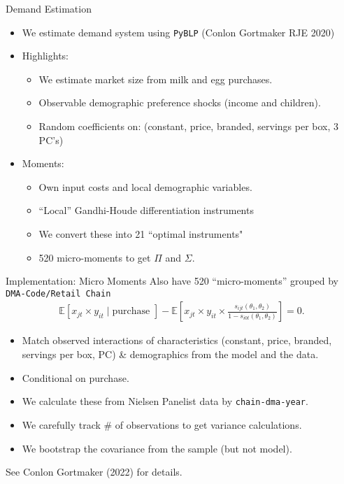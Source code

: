 \begin{frame}[plain,label=maindemand]{Demand Estimation}
\begin{itemize}
\item We estimate demand system using \texttt{PyBLP} (Conlon Gortmaker RJE 2020)
\item Highlights:
\begin{itemize}
\item We estimate market size from milk and egg purchases.
\item Observable demographic preference shocks (income and children).
\item Random coefficients on: (constant, price, branded, servings per box, 3 PC's)
\end{itemize}
\item Moments:
\begin{itemize}
\item Own input costs and local demographic variables.
\item ``Local'' Gandhi-Houde differentiation instruments
\item We convert these into 21 ``optimal instruments"
\item 520 micro-moments to get $\Pi$ and $\Sigma$.
\end{itemize}
\end{itemize}
\end{frame}


\begin{frame}{Implementation: Micro Moments}
Also have 520 ``micro-moments'' grouped by \texttt{DMA-Code/Retail Chain}
\begin{align*}
\mathbb{E} \left[x_{jt} \times y_{it} \mid \text{purchase } \right] 
- \mathbb{E}\left[x_{jt} \times y_{it}  \times \frac{s_{ijt}(\theta_1,\theta_2)}{1-s_{i0t}(\theta_1,\theta_2)}  \right] = 0.
\end{align*}
\begin{itemize}
\item Match observed interactions of characteristics (constant, price, branded, servings per box, PC) \& demographics from the model and the data.
\item Conditional on purchase.
\item We calculate these from Nielsen Panelist data by \texttt{chain-dma-year}.
\item We carefully track \# of observations to get variance calculations.
\item We bootstrap the covariance from the sample (but not model).
\end{itemize}
See Conlon Gortmaker (2022) for details.
\end{frame}

